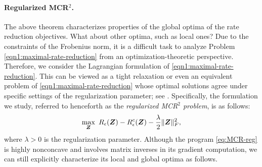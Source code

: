 \documentclass[../../book-main.tex]{subfiles}
\begin{document}
\paragraph{Regularized MCR$^2$.}
The above theorem characterizes properties of the global optima of the rate reduction objectives. What about other optima, such as local ones?  Due to the constraints of the Frobenius norm, it is a difficult task to analyze Problem \eqref{eqn1:maximal-rate-reduction} from an optimization-theoretic perspective. Therefore, we consider the Lagrangian formulation of \eqref{eqn1:maximal-rate-reduction}. This can be viewed as a tight relaxation or even an equivalent problem of \eqref{eqn1:maximal-rate-reduction} whose optimal solutions agree under specific settings of the regularization parameter; see \cite[Proposition 1]{wang2024global}.
Specifically, the formulation we study, referred to henceforth as the \textit{regularized MCR$^2$ problem}, is as follows:
\begin{align}\label{eq:MCR-reg}
	\max_{\bm Z}\ R_{\epsilon}(\bm{Z}) - R_{\epsilon}^c(\bm{Z}) - \frac{\lambda}{2}\|\bm Z\|_F^2,
\end{align}
where $\lambda > 0$ is the regularization parameter. Although the program  \eqref{eq:MCR-reg} is highly nonconcave and involves matrix inverses in its gradient computation, we can still explicitly characterize its local and global optima as follows.
\end{document}
